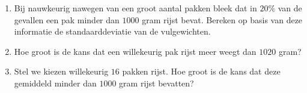 
\begin{enumerate}[label=(\alph*)]
    \item Bij nauwkeurig nawegen van een groot aantal pakken bleek dat in $20\%$ van de gevallen een pak minder dan $1 000$ gram rijst bevat.
    Bereken op basis van deze informatie de standaarddeviatie van de vulgewichten.
    \answer{
        
    }

    \item Hoe groot is de kans dat een willekeurig pak rijst meer weegt dan $1 020$ gram?
    \answer{

    }

    \item Stel we kiezen willekeurig $16$ pakken rijst.
    Hoe groot is de kans dat deze gemiddeld minder dan $1 000$ gram rijst bevatten?
    \answer{
    
    }
\end{enumerate}
